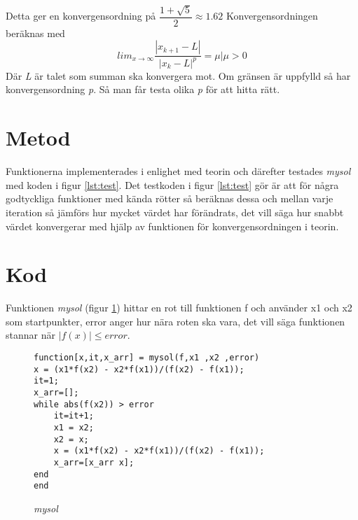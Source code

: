 \documentclass[titlepage, a4paper]{article}
\begin{document}
Detta ger en konvergensordning på $\dfrac{1+\sqrt{5}}{2}\approx1.62$
 Konvergensordningen beräknas med $$lim_{x \rightarrow \infty}\dfrac{|x_{k+1}-L|}{{|x_k-L|}^p}=\mu|\mu>0$$
Där \textit{L} är talet som summan ska konvergera mot. Om gränsen är uppfylld så har konvergensordning \textit{p}. Så man får testa olika \textit{p} för att hitta rätt.

\section{Metod}\label{sec:metod}
Funktionerna implementerades i enlighet med teorin och därefter testades \textit{mysol} med koden i figur \ref{lst:test}. Det testkoden i figur \ref{lst:test} gör är att för några godtyckliga funktioner med kända rötter så beräknas dessa och mellan varje iteration så jämförs hur mycket värdet har förändrats, det vill säga hur snabbt värdet konvergerar med hjälp av funktionen för konvergensordningen i teorin.

\section{Kod}
Funktionen \textit{mysol} (figur \ref{lst:mysol}) hittar en rot till funktionen f och använder x1 och x2 som startpunkter, error anger hur nära roten ska vara, det vill säga funktionen stannar när $|f(x)| \leq error$.

\begin{figure}[H]
  \begin{lstlisting}
function[x,it,x_arr] = mysol(f,x1 ,x2 ,error)
x = (x1*f(x2) - x2*f(x1))/(f(x2) - f(x1));
it=1;
x_arr=[];
while abs(f(x2)) > error
    it=it+1;
    x1 = x2;
    x2 = x;
    x = (x1*f(x2) - x2*f(x1))/(f(x2) - f(x1));
    x_arr=[x_arr x];
end
end
  \end{lstlisting}
  \caption{\textit{mysol}}
  \label{lst:mysol}
\end{figure}
\end{document}
